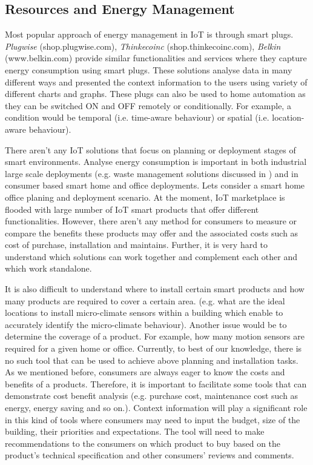 \documentclass[journal]{IEEEtran}
\begin{document}
     
  
    \subsection{Resources and Energy Management}
    \label{sec:Resources}
    
  Most popular approach of energy management in IoT is through smart plugs.  \textit{Plugwise} (shop.plugwise.com), \textit{Thinkecoinc} (shop.thinkecoinc.com), \textit{Belkin} (www.belkin.com) provide similar functionalities and services where they capture energy consumption using smart plugs. These solutions analyse data in many different ways and presented the context information to the users using variety of different charts and graphs. These plugs can also be used to home automation as they can be switched ON and OFF remotely or conditionally. For example, a condition would be temporal (i.e. time-aware behaviour) or spatial (i.e. location-aware behaviour). 
  
   There aren't any IoT solutions that focus on planning or deployment stages of smart environments. Analyse energy consumption is important in both industrial large scale deployments (e.g. waste management solutions discussed in \cite{ZMP008}) and in consumer based smart home and office deployments.   Lets consider a smart home office planing and deployment scenario. At the moment, IoT marketplace is flooded with large number of IoT smart products that offer different functionalities. However, there aren't any method for consumers to measure or compare the benefits these products may offer and the associated costs such as  cost of purchase, installation and maintains. Further, it is very hard to understand which solutions can work together and complement each other and which work standalone. 
   
   It is also difficult to understand where to install certain smart products and how many products are required to cover a certain area. (e.g. what are the ideal locations to install micro-climate sensors within a building which enable to accurately identify the micro-climate behaviour).  Another issue would be to determine the coverage of a product. For example, how many motion sensors are required for a given home or office. Currently, to best of our knowledge, there is no such tool that  can be used to achieve above planning and installation tasks. As we mentioned before, consumers are always eager to know the costs and benefits of a products. Therefore, it is important to facilitate some tools that can demonstrate cost benefit analysis (e.g. purchase cost, maintenance cost such as energy, energy saving and so on.). Context information will play a significant role in this kind of tools where consumers may need to input the budget, size of the building, their priorities and expectations. The tool will need to make recommendations to the consumers on which product to buy based on the product's technical specification and other consumers' reviews and comments.
\end{document}
